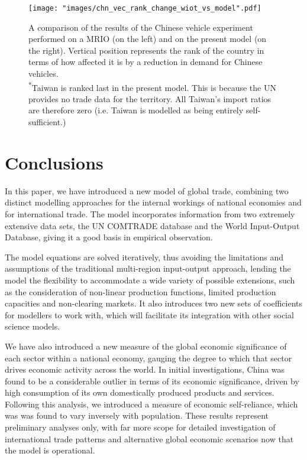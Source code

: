 \documentclass[a4paper]{article}
\begin{document}
\begin{figure}[p]
\centering
\texttt{[image: "images/chn\_vec\_rank\_change\_wiot\_vs\_model".pdf]}
\caption{A comparison of the results of the Chinese vehicle experiment performed on a MRIO (on the left) and on the present model (on the right).
Vertical position represents the rank of the country in terms of how affected it is by a reduction in demand for Chinese vehicles.\\
\textsuperscript{*}Taiwan is ranked last in the present model.
This is because the UN provides no trade data for the territory.
All Taiwan's import ratios are therefore zero (i.e. Taiwan is modelled as being entirely self-sufficient.)}
\label{fig:chn_vec_model_vs_wiot}
\end{figure}


\section{Conclusions}\label{sec:conclusions}
In this paper, we have introduced a new model of global trade, combining two distinct modelling approaches for the internal workings of national economies and for international trade.
The model incorporates information from two extremely extensive data sets, the UN COMTRADE database and the World Input-Output Database, giving it a good basis in empirical observation.

The model equations are solved iteratively, thus avoiding the limitations and assumptions of the traditional multi-region input-output approach, lending the model the flexibility to accommodate a wide variety of possible extensions, such as the consideration of non-linear production functions, limited production capacities and non-clearing markets.
It also introduces two new sets of coefficients for modellers to work with, which will facilitate its integration with other social science models.

We have also introduced a new measure of the global economic significance of each sector within a national economy, gauging the degree to which that sector drives economic activity across the world.
In initial investigations, China was found to be a considerable outlier in terms of its economic significance, driven by high consumption of its own domestically produced products and services.
Following this analysis, we introduced a measure of economic self-reliance, which was was found to vary inversely with population.
These results represent preliminary analyses only, with far more scope for detailed investigation of international trade patterns and alternative global economic scenarios now that the model is operational.
\end{document}
